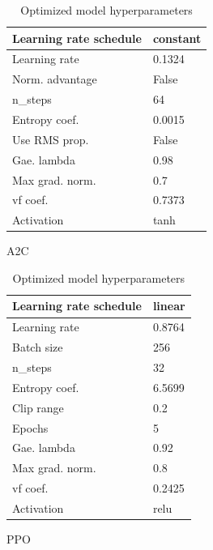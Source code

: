 \documentclass{article}
\begin{document}
\begin{table}[H]
	\begin{subtable}[h]{0.45\textwidth}
		\centering
		\begin{tabular}{|l | l|}
		\hline
		Learning rate schedule & constant  \\
		\hline
		Learning rate & 0.1324  \\
		\hline
		Norm. advantage & False  \\
		\hline
		n\_steps & 64  \\
		\hline
		Entropy coef. & 0.0015 \\
		\hline
		Use RMS prop. & False  \\
		\hline
		Gae. lambda & 0.98 \\
		\hline
		Max grad. norm. & 0.7  \\
		\hline
		vf coef. & 0.7373  \\
		\hline
		Activation  & tanh  \\
		\hline
		\end{tabular}
		\caption{A2C}
		\label{tab:a2c}
	\end{subtable}
	\hfill
	\begin{subtable}[h]{0.45\textwidth}
		\centering
		\begin{tabular}{|l | l |}
		\hline
		Learning rate schedule & linear \\
		\hline 
		Learning rate & 0.8764  \\
		\hline
		Batch size & 256  \\
		\hline
		n\_steps & 32  \\
		\hline
		Entropy coef. & 6.5699 \\
		\hline
		Clip range & 0.2  \\
		\hline
		Epochs & 5 \\
		\hline
		Gae. lambda & 0.92 \\
		\hline
		Max grad. norm. &  0.8 \\
		\hline
		vf coef. & 0.2425  \\
		\hline
		Activation & relu \\
		\hline
		\end{tabular}
		\caption{PPO}
		\label{tab:ppo}
	\end{subtable}
	\caption{Optimized model hyperparameters}
	\label{tab:hyp}
\end{table}
\end{document}
